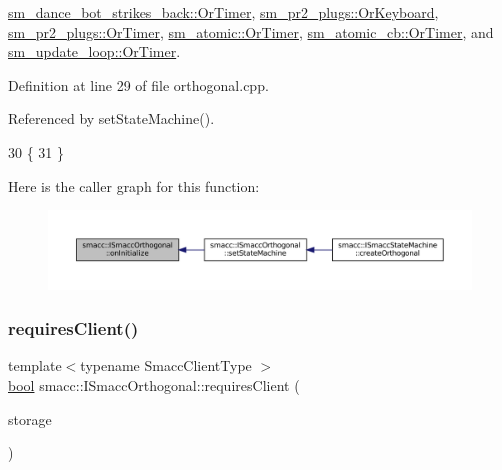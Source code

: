 \hyperlink{classsm__dance__bot__strikes__back_1_1OrTimer_a89c7a3040c7d44d877d8b85b89883cb1}{sm\+\_\+dance\+\_\+bot\+\_\+strikes\+\_\+back\+::\+Or\+Timer}, \hyperlink{classsm__pr2__plugs_1_1OrKeyboard_ad54c87907039f7fb592aada01154353d}{sm\+\_\+pr2\+\_\+plugs\+::\+Or\+Keyboard}, \hyperlink{classsm__pr2__plugs_1_1OrTimer_a261938a89cf08744103332ffb0ee2976}{sm\+\_\+pr2\+\_\+plugs\+::\+Or\+Timer}, \hyperlink{classsm__atomic_1_1OrTimer_a509b0d9ce7c6ed9e0c291decaf6dd280}{sm\+\_\+atomic\+::\+Or\+Timer}, \hyperlink{classsm__atomic__cb_1_1OrTimer_a0d010997d6304786b2b91ae3f32fa978}{sm\+\_\+atomic\+\_\+cb\+::\+Or\+Timer}, and \hyperlink{classsm__update__loop_1_1OrTimer_af2b4637bc236bcaada12b703c5f0a110}{sm\+\_\+update\+\_\+loop\+::\+Or\+Timer}.



Definition at line 29 of file orthogonal.\+cpp.



Referenced by set\+State\+Machine().


\begin{DoxyCode}
30   \{
31   \}
\end{DoxyCode}
Here is the caller graph for this function\+:
\nopagebreak
\begin{figure}[H]
\begin{center}
\leavevmode
\includegraphics[width=350pt]{classsmacc_1_1ISmaccOrthogonal_a6bb31c620cb64dd7b8417f8705c79c7a_icgraph}
\end{center}
\end{figure}
\mbox{\label{classsmacc_1_1ISmaccOrthogonal_a602e16b09f8a1b3de889f2f3d90a3211}} 
\subsubsection{\texorpdfstring{requires\+Client()}{requiresClient()}}
{\footnotesize\ttfamily template$<$typename Smacc\+Client\+Type $>$ \\
\hyperlink{classbool}{bool} smacc\+::\+I\+Smacc\+Orthogonal\+::requires\+Client (\begin{DoxyParamCaption}\item[{Smacc\+Client\+Type $\ast$\&}]{storage }\end{DoxyParamCaption})}



